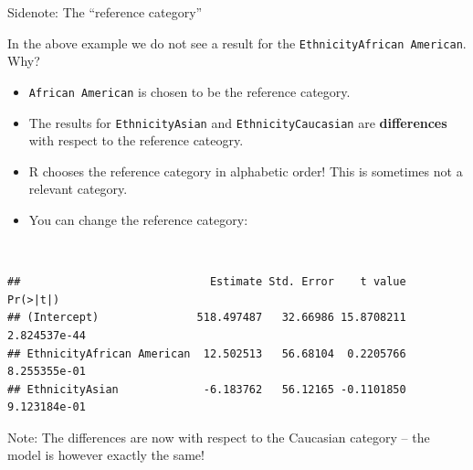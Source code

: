 \documentclass[
  10pt,
  ignorenonframetext,
]{beamer}
\newenvironment{Shaded}{\begin{snugshade}}{\end{snugshade}}
\newcommand{\AttributeTok}[1]{\textcolor[rgb]{0.13,0.29,0.53}{#1}}
\newcommand{\FunctionTok}[1]{\textcolor[rgb]{0.13,0.29,0.53}{\textbf{#1}}}
\newcommand{\NormalTok}[1]{#1}
\newcommand{\OtherTok}[1]{\textcolor[rgb]{0.56,0.35,0.01}{#1}}
\newcommand{\SpecialCharTok}[1]{\textcolor[rgb]{0.81,0.36,0.00}{\textbf{#1}}}
\newcommand{\StringTok}[1]{\textcolor[rgb]{0.31,0.60,0.02}{#1}}
\providecommand{\tightlist}{%
  \setlength{\itemsep}{0pt}\setlength{\parskip}{0pt}}
\begin{document}
\begin{frame}[fragile]
\begin{block}{Sidenote: The ``reference category''}
\protect\hypertarget{sidenote-the-reference-category}{}
\vspace{2mm}

In the above example we do not see a result for the
\texttt{EthnicityAfrican\ American}. Why?

\begin{itemize}
\tightlist
\item
  \texttt{African\ American} is chosen to be the reference category.
\item
  The results for \texttt{EthnicityAsian} and
  \texttt{EthnicityCaucasian} are \textbf{differences} with respect to
  the reference cateogry.
\item
  R chooses the reference category in alphabetic order! This is
  sometimes not a relevant category.
\item
  You can change the reference category:
\end{itemize}

\(~\)

\scriptsize

\begin{Shaded}
\end{Shaded}

\begin{verbatim}
##                             Estimate Std. Error    t value     Pr(>|t|)
## (Intercept)               518.497487   32.66986 15.8708211 2.824537e-44
## EthnicityAfrican American  12.502513   56.68104  0.2205766 8.255355e-01
## EthnicityAsian             -6.183762   56.12165 -0.1101850 9.123184e-01
\end{verbatim}

\vspace{2mm}

\small

Note: The differences are now with respect to the Caucasian category --
the model is however exactly the same!
\end{block}
\end{frame}
\end{document}
